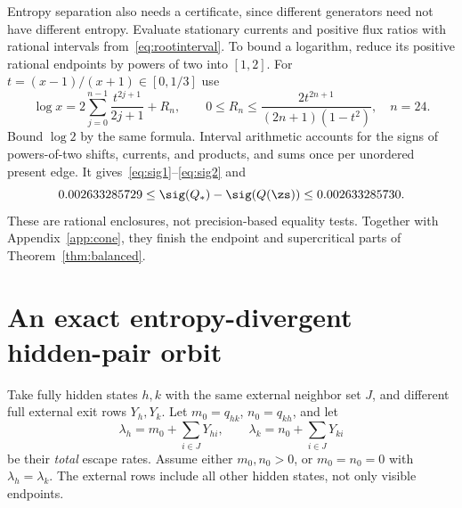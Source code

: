 Entropy separation also needs a certificate, since different generators need not have different entropy. Evaluate stationary currents and positive flux ratios with rational intervals from~\eqref{eq:rootinterval}. To bound a logarithm, reduce its positive rational endpoints by powers of two into $[1,2]$. For $t=(x-1)/(x+1)\in[0,1/3]$ use
\begin{equation}
 \log x=2\sum_{j=0}^{n-1}\frac{t^{2j+1}}{2j+1}+R_n,\qquad
 0\le R_n\le\frac{2t^{2n+1}}{(2n+1)(1-t^2)},\quad n=24.\label{eq:logbound}
\end{equation}
Bound $\log2$ by the same formula. Interval arithmetic accounts for the signs of powers-of-two shifts, currents, and products, and sums once per unordered present edge. It gives~\eqref{eq:sig1}--\eqref{eq:sig2} and
\begin{equation}
 0.002633285729\le\sig(Q_*)-\sig(Q(\zs))\le0.002633285730.
\end{equation}
These are rational enclosures, not precision-based equality tests. Together with Appendix~\ref{app:cone}, they finish the endpoint and supercritical parts of Theorem~\ref{thm:balanced}.

\section{An exact entropy-divergent hidden-pair orbit}\label{app:pair}
Take fully hidden states $h,k$ with the same external neighbor set $J$, and different full external exit rows $Y_h,Y_k$. Let $m_0=q_{hk}$, $n_0=q_{kh}$, and let
\begin{equation}
 \lambda_h=m_0+\sum_{i\in J}Y_{hi},\qquad
 \lambda_k=n_0+\sum_{i\in J}Y_{ki}
\end{equation}
be their \emph{total} escape rates. Assume either $m_0,n_0>0$, or $m_0=n_0=0$ with $\lambda_h=\lambda_k$. The external rows include all other hidden states, not only visible endpoints.

